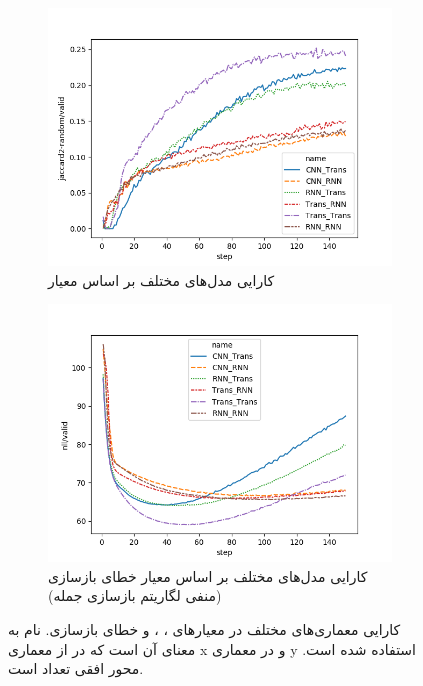 \begin{figure}[h]
\begin{subfigure}{0.3\textheight}
		\centering
		\includegraphics[width=1.\textwidth]{images/figs/jaccard2-random.png}
		\caption{کارایی مدل‌های مختلف بر اساس معیار \jaccard[-2]{}}
		\label{fig:chap4:archs_jac}
	\end{subfigure}
	\begin{subfigure}{0.3\textheight}
		\centering
		\includegraphics[width=1.\textwidth]{images/figs/nll.png}
		\caption{
			کارایی مدل‌های مختلف بر اساس معیار خطای بازسازی (منفی لگاریتم \likelihood{} باز‌سازی جمله)}
		\label{fig:chap4:archs_nll}
	\end{subfigure}
	\caption{
		کارایی معماری‌های مختلف در معیارهای \bleu[-2]{}، \selfbleu[-2]{}، \jaccard[-2]{} و خطای بازسازی.
		نام  به معنای آن است که در \encoder{} از معماری x و در \decoder{} معماری y استفاده شده است. محور افقی تعداد  است.}
	\label{fig:chap4:archs}
\end{figure}

